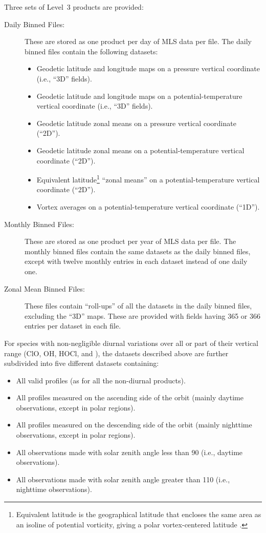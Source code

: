 Three sets of Level~3 products are provided:
\begin{description}
  \item[Daily Binned Files:] These are stored as one product per day of MLS data per file. The daily binned files contain the following datasets:
    \begin{itemize}
      \item Geodetic latitude and longitude maps on a pressure vertical coordinate (i.e., ``3D'' fields).
      \item Geodetic latitude and longitude maps on a potential-temperature vertical coordinate (i.e., ``3D'' fields).
      \item Geodetic latitude zonal means on a pressure vertical coordinate (``2D'').
      \item Geodetic latitude zonal means on a potential-temperature vertical coordinate (``2D'').
      \item Equivalent latitude\footnote{Equivalent latitude is the geographical latitude that encloses the same area as an isoline of potential vorticity, giving a polar vortex-centered latitude \citep{ButchartandRemsberg:1986}.} ``zonal means'' on a potential-temperature vertical coordinate (``2D'').
      \item Vortex averages on a potential-temperature vertical coordinate (``1D'').
    \end{itemize}
  \item[Monthly Binned Files:] These are stored as one product per year of MLS data per file. The monthly binned files contain the same datasets as the daily binned files, except with twelve monthly entries in each dataset instead of one daily one.
  \item[Zonal Mean Binned Files:] These files contain ``roll-ups'' of all the datasets in the daily binned files, excluding the ``3D'' maps. These are provided with fields having 365 or 366 entries per dataset in each file.
\end{description}
For species with non-negligible diurnal variations over all or part of their vertical range (ClO, OH, HOCl, and ), the datasets described above are further subdivided into five different datasets containing:
\begin{itemize}
  \item All valid profiles (as for all the non-diurnal products).
  \item All profiles measured on the ascending side of the orbit (mainly daytime observations, except in polar regions).
  \item All profiles measured on the descending side of the orbit (mainly nighttime observations, except in polar regions).
  \item All observations made with solar zenith angle less than 90\textdegree{} (i.e., daytime observations).
  \item All observations made with solar zenith angle greater than 110\textdegree{} (i.e., nighttime observations).
\end{itemize}
